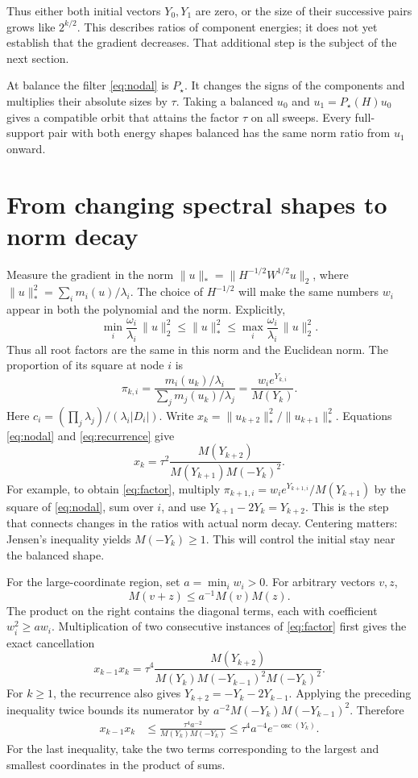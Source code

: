 \documentclass[11pt,a4paper]{article}
\numberwithin{equation}{section}
\DeclareMathOperator{\osc}{osc}
\newcommand{\abs}[1]{\lvert #1\rvert}
\newcommand{\norm}[1]{\lVert #1\rVert}
\begin{document}
Thus either both initial vectors \(Y_0,Y_1\) are zero, or the
size of their successive pairs grows like \(2^{k/2}\). This describes
ratios of component energies; it does not yet establish that the
gradient decreases. That additional step is the subject of the next
section.

At balance the filter \eqref{eq:nodal} is \(P_\star\). It changes the signs of the components and multiplies their absolute sizes by \(\tau\). Taking a balanced \(u_0\) and \(u_1=P_\star(H)u_0\) gives a compatible orbit that attains the factor \(\tau\) on all sweeps. Every full-support pair with both energy shapes balanced has the same norm ratio from \(u_1\) onward.

\section{From changing spectral shapes to norm decay}

Measure the gradient in the norm \(\norm u_*=\norm{H^{-1/2}W^{1/2}u}_2\), where \(\norm u_*^2=\sum_i m_i(u)/\lambda_i\). The choice of \(H^{-1/2}\) will make the same numbers \(w_i\)
appear in both the polynomial and the norm. Explicitly,
\[
 \min_i\frac{\omega_i}{\lambda_i}\,\|u\|_2^2
 \le \|u\|_*^2
 \le \max_i\frac{\omega_i}{\lambda_i}\,\|u\|_2^2.
\]
Thus all root factors are the same in this norm and the Euclidean norm. The proportion of its square at node \(i\) is
\[
  \pi_{k,i}=\frac{m_i(u_k)/\lambda_i}{\sum_j m_j(u_k)/\lambda_j}
           =\frac{w_i e^{Y_{k,i}}}{M(Y_k)} .
\]
Here \(c_i=(\prod_j\lambda_j)/(\lambda_i\abs{D_i})\). Write \(x_k=\norm{u_{k+2}}_*^2/\norm{u_{k+1}}_*^2\). Equations \eqref{eq:nodal} and \eqref{eq:recurrence} give
\begin{equation}\label{eq:factor}
 x_k=\tau^2\frac{M(Y_{k+2})}{M(Y_{k+1})M(-Y_k)^2}.
\end{equation}
For example, to obtain \eqref{eq:factor}, multiply
\(\pi_{k+1,i}=w_ie^{Y_{k+1,i}}/M(Y_{k+1})\) by the square of
\eqref{eq:nodal}, sum over \(i\), and use
\(Y_{k+1}-2Y_k=Y_{k+2}\).
This is the step that connects changes in the ratios with actual
norm decay. Centering matters: Jensen's inequality yields \(M(-Y_k)\ge1\). This will control the initial stay near the balanced shape.

For the large-coordinate region, set \(a=\min_i w_i>0\). For arbitrary vectors \(v,z\),
\[
 M(v+z)\le a^{-1}M(v)M(z).
\]
The product on the right contains the diagonal terms, each with coefficient \(w_i^2\ge aw_i\). Multiplication of two consecutive instances of \eqref{eq:factor}
first gives the exact cancellation
\[
 x_{k-1}x_k
 =\tau^4
 \frac{M(Y_{k+2})}
 {M(Y_k)M(-Y_{k-1})^2M(-Y_k)^2}.
\]
For \(k\ge1\), the recurrence also gives
\(Y_{k+2}=-Y_k-2Y_{k-1}\). Applying the preceding inequality twice
bounds its numerator by
\(a^{-2}M(-Y_k)M(-Y_{k-1})^2\). Therefore
\begin{align}
 x_{k-1}x_k
 &\le \frac{\tau^4 a^{-2}}{M(Y_k)M(-Y_k)}
 \le \tau^4 a^{-4}e^{-\osc(Y_k)} . \label{eq:two}
\end{align}
For the last inequality, take the two terms corresponding to the largest and smallest coordinates in the product of sums.
\end{document}
